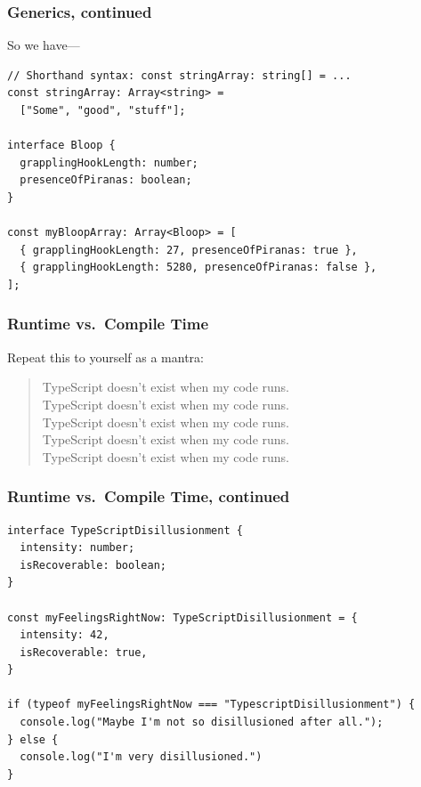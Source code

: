 \documentclass[aspectratio=169]{beamer}
\begin{document}
\begin{frame}[fragile]
  \frametitle{Generics, continued}

  So we have--- \\

  \begin{verbatim}
// Shorthand syntax: const stringArray: string[] = ...
const stringArray: Array<string> =
  ["Some", "good", "stuff"];

interface Bloop {
  grapplingHookLength: number;
  presenceOfPiranas: boolean;
}

const myBloopArray: Array<Bloop> = [
  { grapplingHookLength: 27, presenceOfPiranas: true },
  { grapplingHookLength: 5280, presenceOfPiranas: false },
];
  \end{verbatim}
\end{frame}

\begin{frame}
  \frametitle{Runtime vs.\ Compile Time}

  Repeat this to yourself as a mantra: \\

  \begin{quote}
    TypeScript doesn't exist when my code runs. \\
    TypeScript doesn't exist when my code runs. \\
    TypeScript doesn't exist when my code runs. \\
    TypeScript doesn't exist when my code runs. \\
    TypeScript doesn't exist when my code runs.
  \end{quote}
\end{frame}

\begin{frame}[fragile]
  \frametitle{Runtime vs.\ Compile Time, continued}
  \small
  \begin{verbatim}
interface TypeScriptDisillusionment {
  intensity: number;
  isRecoverable: boolean;
}

const myFeelingsRightNow: TypeScriptDisillusionment = {
  intensity: 42,
  isRecoverable: true,
}

if (typeof myFeelingsRightNow === "TypescriptDisillusionment") {
  console.log("Maybe I'm not so disillusioned after all.");
} else {
  console.log("I'm very disillusioned.")
}
  \end{verbatim}
\end{frame}
\end{document}
